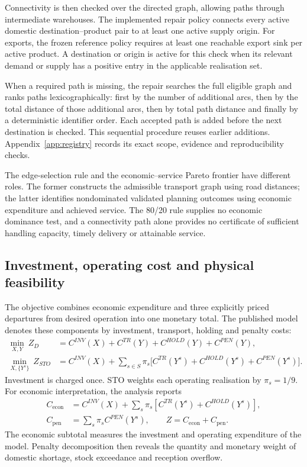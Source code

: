 \documentclass[11pt,a4paper]{article}
\begin{document}
Connectivity is then checked over the directed graph, allowing paths through intermediate warehouses. The implemented repair policy connects every active domestic destination--product pair to at least one active supply origin. For exports, the frozen reference policy requires at least one reachable export sink per active product. A destination or origin is active for this check when its relevant demand or supply has a positive entry in the applicable realisation set.

When a required path is missing, the repair searches the full eligible graph and ranks paths lexicographically: first by the number of additional arcs, then by the total distance of those additional arcs, then by total path distance and finally by a deterministic identifier order. Each accepted path is added before the next destination is checked. This sequential procedure reuses earlier additions. Appendix~\ref{app:registry} records its exact scope, evidence and reproducibility checks.

The edge-selection rule and the economic--service Pareto frontier have different roles. The former constructs the admissible transport graph using road distances; the latter identifies nondominated validated planning outcomes using economic expenditure and achieved service. The 80/20 rule supplies no economic dominance test, and a connectivity path alone provides no certificate of sufficient handling capacity, timely delivery or attainable service.

\subsection{Investment, operating cost and physical feasibility}

The objective combines economic expenditure and three explicitly priced departures from desired operation into one monetary total. The published model denotes these components by investment, transport, holding and penalty costs:
\begin{align}
\min_{X,Y}\ Z_D
 &=C^{INV}(X)+C^{TR}(Y)+C^{HOLD}(Y)+C^{PEN}(Y),\label{eq:detobj}\\
\min_{X,\{Y^s\}}\ Z_{STO}
 &=C^{INV}(X)+\sum_{s\in S}\pi_s
   \bigl[C^{TR}(Y^s)+C^{HOLD}(Y^s)+C^{PEN}(Y^s)\bigr].
 \label{eq:stoobj}
\end{align}
Investment is charged once. STO weights each operating realisation by $\pi_s=1/9$. For economic interpretation, the analysis reports
\begin{align}
C_{\mathrm{econ}}
 &=C^{INV}(X)+\sum_s\pi_s[C^{TR}(Y^s)+C^{HOLD}(Y^s)],\\
C_{\mathrm{pen}}
 &=\sum_s\pi_s C^{PEN}(Y^s),\qquad Z=C_{\mathrm{econ}}+C_{\mathrm{pen}}.
\end{align}
The economic subtotal measures the investment and operating expenditure of the model. Penalty decomposition then reveals the quantity and monetary weight of domestic shortage, stock exceedance and reception overflow.
\end{document}
